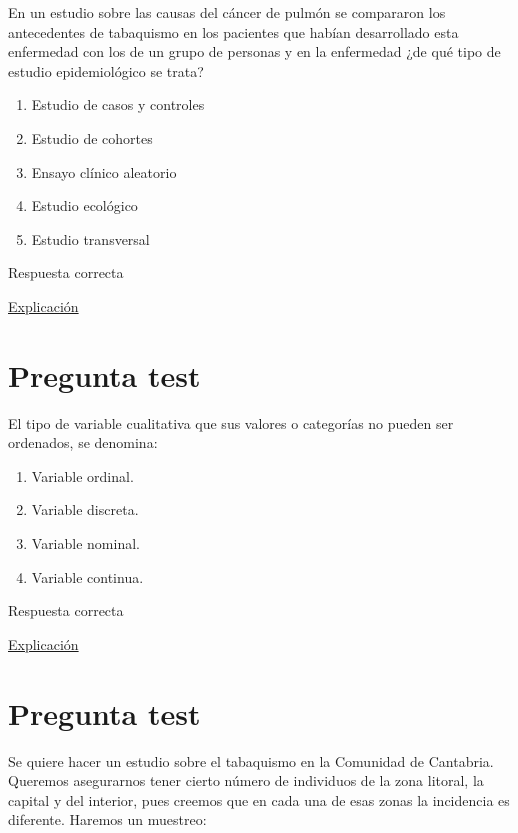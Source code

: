 \documentclass[
]{book}
\providecommand{\tightlist}{%
  \setlength{\itemsep}{0pt}\setlength{\parskip}{0pt}}
\begin{document}
En un estudio sobre las causas del cáncer de pulmón se compararon los antecedentes de tabaquismo en los pacientes que habían desarrollado esta enfermedad con los de un grupo de personas y en la enfermedad ¿de qué tipo de estudio epidemiológico se trata?

\begin{enumerate}
\def\labelenumi{\alph{enumi})}
\tightlist
\item
  Estudio de casos y controles
\item
  Estudio de cohortes
\item
  Ensayo clínico aleatorio
\item
  Estudio ecológico
\item
  Estudio transversal
\end{enumerate}

Respuesta correcta

\href{http://www.scielo.org.pe/scielo.php?script=sci_arttext\&pid=S2308-05312020000100138}{Explicación}

\hypertarget{pregunta-test-41}{%
\section{Pregunta test}\label{pregunta-test-41}}

El tipo de variable cualitativa que sus valores o categorías no pueden ser ordenados, se denomina:

\begin{enumerate}
\def\labelenumi{\alph{enumi})}
\tightlist
\item
  Variable ordinal.
\item
  Variable discreta.
\item
  Variable nominal.
\item
  Variable continua.
\end{enumerate}

Respuesta correcta

\href{https://1fjmanzano.github.io/bioestadistica/tipos-de-variables.html}{Explicación}

\hypertarget{pregunta-test-42}{%
\section{Pregunta test}\label{pregunta-test-42}}

Se quiere hacer un estudio sobre el tabaquismo en la Comunidad de Cantabria. Queremos asegurarnos tener cierto número de individuos de la zona litoral, la capital y del interior, pues creemos que en cada una de esas zonas la incidencia es diferente. Haremos un muestreo:
\end{document}
